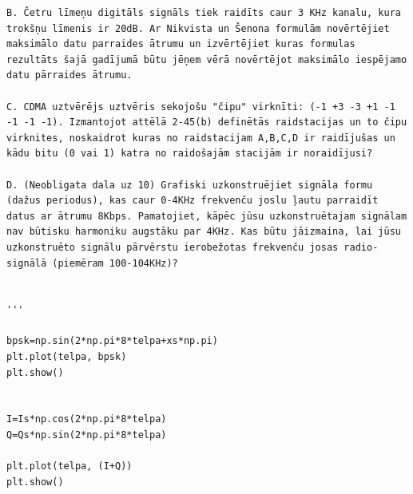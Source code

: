 \documentclass[a4paper,11pt]{article}
\begin{document}
\begin{verbatim}
B. Četru līmeņu digitāls signāls tiek raidīts caur 3 KHz kanalu, kura trokšņu līmenis ir 20dB. Ar Nikvista un Šenona formulām novērtējiet maksimālo datu parraides ātrumu un izvērtējiet kuras formulas rezultāts šajā gadījumā būtu jēņem vērā novērtējot maksimālo iespējamo datu pārraides ātrumu.

C. CDMA uztvērējs uztvēris sekojošu "čipu" virknīti: (-1 +3 -3 +1 -1 -1 -1 -1). Izmantojot attēlā 2-45(b) definētās raidstacijas un to čipu virknites, noskaidrot kuras no raidstacijam A,B,C,D ir raidījušas un kādu bitu (0 vai 1) katra no raidošajām stacijām ir noraidījusi?

D. (Neobligata dala uz 10) Grafiski uzkonstruējiet signāla formu (dažus periodus), kas caur 0-4KHz frekvenču joslu ļautu parraidīt datus ar ātrumu 8Kbps. Pamatojiet, kāpēc jūsu uzkonstruētajam signālam nav būtisku harmoniku augstāku par 4KHz. Kas būtu jāizmaina, lai jūsu uzkonstruēto signālu pārvērstu ierobežotas frekvenču josas radio-signālā (piemēram 100-104KHz)?


'''

bpsk=np.sin(2*np.pi*8*telpa+xs*np.pi)
plt.plot(telpa, bpsk)
plt.show()


I=Is*np.cos(2*np.pi*8*telpa)
Q=Qs*np.sin(2*np.pi*8*telpa)

plt.plot(telpa, (I+Q))
plt.show()






\end{verbatim}
\end{document}
